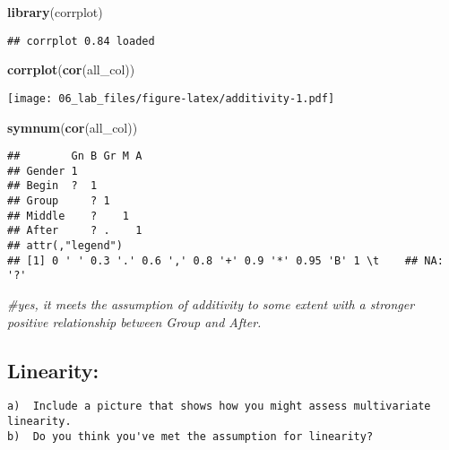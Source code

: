 \documentclass[
]{article}
\newenvironment{Shaded}{\begin{snugshade}}{\end{snugshade}}
\newcommand{\CommentTok}[1]{\textcolor[rgb]{0.56,0.35,0.01}{\textit{#1}}}
\newcommand{\KeywordTok}[1]{\textcolor[rgb]{0.13,0.29,0.53}{\textbf{#1}}}
\newcommand{\NormalTok}[1]{#1}
\begin{document}
\begin{Shaded}
\begin{Highlighting}[]
\KeywordTok{library}\NormalTok{(corrplot)}
\end{Highlighting}
\end{Shaded}

\begin{verbatim}
## corrplot 0.84 loaded
\end{verbatim}

\begin{Shaded}
\begin{Highlighting}[]
\KeywordTok{corrplot}\NormalTok{(}\KeywordTok{cor}\NormalTok{(all_col))}
\end{Highlighting}
\end{Shaded}

\texttt{[image: 06\_lab\_files/figure-latex/additivity-1.pdf]}

\begin{Shaded}
\begin{Highlighting}[]
\KeywordTok{symnum}\NormalTok{(}\KeywordTok{cor}\NormalTok{(all_col))}
\end{Highlighting}
\end{Shaded}

\begin{verbatim}
##        Gn B Gr M A
## Gender 1          
## Begin  ?  1       
## Group     ? 1     
## Middle    ?    1  
## After     ? .    1
## attr(,"legend")
## [1] 0 ' ' 0.3 '.' 0.6 ',' 0.8 '+' 0.9 '*' 0.95 'B' 1 \t    ## NA: '?'
\end{verbatim}

\begin{Shaded}
\begin{Highlighting}[]
\CommentTok{#yes, it meets the assumption of additivity to some extent with a stronger positive relationship between Group and After.}
\end{Highlighting}
\end{Shaded}

\hypertarget{linearity}{%
\subsection{Linearity:}\label{linearity}}

\begin{verbatim}
a)  Include a picture that shows how you might assess multivariate linearity.
b)  Do you think you've met the assumption for linearity?
\end{verbatim}
\end{document}
